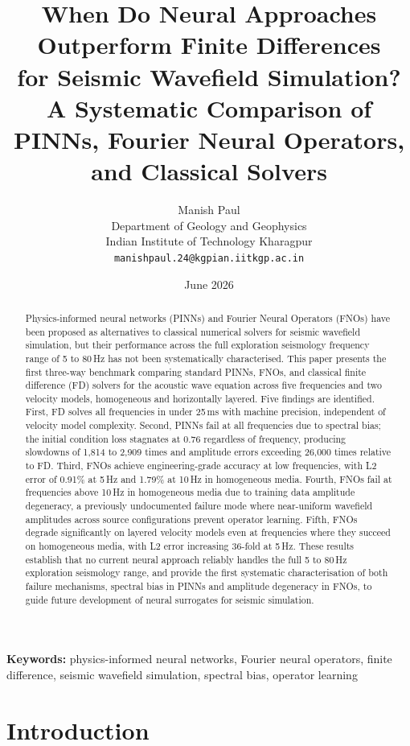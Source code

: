 \documentclass[12pt,a4paper]{article}
\title{\textbf{When Do Neural Approaches Outperform Finite Differences\\
for Seismic Wavefield Simulation?\\
A Systematic Comparison of PINNs, Fourier Neural Operators,\\
and Classical Solvers}}
\author{
Manish Paul\\
\small Department of Geology and Geophysics\\
\small Indian Institute of Technology Kharagpur\\
\small \texttt{manishpaul.24@kgpian.iitkgp.ac.in}
}
\date{June 2026}
\begin{document}
\maketitle

\begin{abstract}
Physics-informed neural networks (PINNs) and Fourier Neural
Operators (FNOs) have been proposed as alternatives to classical
numerical solvers for seismic wavefield simulation, but their
performance across the full exploration seismology frequency range
of 5 to 80\,Hz has not been systematically characterised. This
paper presents the first three-way benchmark comparing standard
PINNs, FNOs, and classical finite difference (FD) solvers for the
acoustic wave equation across five frequencies and two velocity
models, homogeneous and horizontally layered. Five findings are
identified. First, FD solves all frequencies in under 25\,ms with
machine precision, independent of velocity model complexity.
Second, PINNs fail at all frequencies due to spectral bias; the
initial condition loss stagnates at 0.76 regardless of frequency,
producing slowdowns of 1,814 to 2,909 times and amplitude errors
exceeding 26,000 times relative to FD. Third, FNOs achieve
engineering-grade accuracy at low frequencies, with L2 error of
0.91\% at 5\,Hz and 1.79\% at 10\,Hz in homogeneous media.
Fourth, FNOs fail at frequencies above 10\,Hz in homogeneous
media due to training data amplitude degeneracy, a previously
undocumented failure mode where near-uniform wavefield amplitudes
across source configurations prevent operator learning. Fifth,
FNOs degrade significantly on layered velocity models even at
frequencies where they succeed on homogeneous media, with L2
error increasing 36-fold at 5\,Hz. These results establish that
no current neural approach reliably handles the full 5 to 80\,Hz
exploration seismology range, and provide the first systematic
characterisation of both failure mechanisms, spectral bias in
PINNs and amplitude degeneracy in FNOs, to guide future
development of neural surrogates for seismic simulation.
\end{abstract}

\textbf{Keywords:} physics-informed neural networks, Fourier
neural operators, finite difference, seismic wavefield simulation,
spectral bias, operator learning

\section{Introduction}
\end{document}
